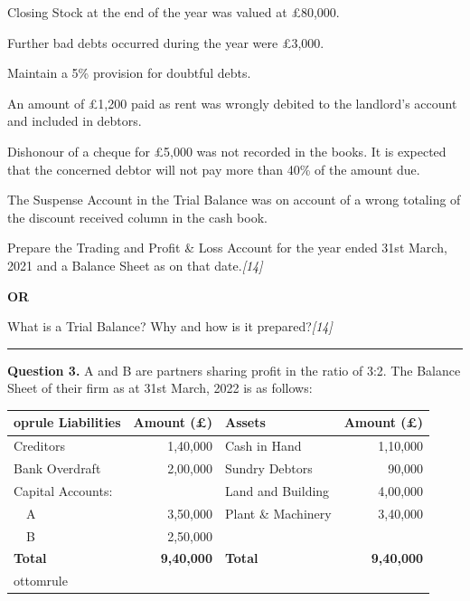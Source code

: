 \documentclass[11pt,a4paper]{article}
\newcommand{\pts}[1]{\hfill   \textit{[#1]}}
\begin{document}
\begin{parts}
  \item Closing Stock at the end of the year was valued at \pounds 80,000.
  \item Further bad debts occurred during the year were \pounds 3,000.
  \item Maintain a 5\% provision for doubtful debts.
  \item An amount of \pounds 1,200 paid as rent was wrongly debited to the landlord's account and included in debtors.
  \item Dishonour of a cheque for \pounds 5,000 was not recorded in the books. It is expected that the concerned debtor will not pay more than 40\% of the amount due.
  \item The Suspense Account in the Trial Balance was on account of a wrong totaling of the discount received column in the cash book.
\end{parts}
Prepare the Trading and Profit \& Loss Account for the year ended 31st March, 2021 and a Balance Sheet as on that date.\pts{14}

\centerline{   \textbf{OR}}

What is a Trial Balance? Why and how is it prepared?\pts{14}

\medskip\rule{\linewidth}{0.2pt}


\newpage




\noindent   \textbf{Question 3.}
A and B are partners sharing profit in the ratio of 3:2. The Balance Sheet of their firm as at 31st March, 2022 is as follows:


\begin{center}

\begin{tabular}{lr|lr}
 oprule
   \textbf{Liabilities} &   \textbf{Amount (\pounds)} &   \textbf{Assets} &   \textbf{Amount (\pounds)} \\
\midrule
Creditors & 1,40,000 & Cash in Hand & 1,10,000 \\
Bank Overdraft & 2,00,000 & Sundry Debtors & 90,000 \\
Capital Accounts: & & Land and Building & 4,00,000 \\
~~A & 3,50,000 & Plant \& Machinery & 3,40,000 \\
~~B & 2,50,000 & & \\
\midrule
   \textbf{Total} &   \textbf{9,40,000} &   \textbf{Total} &   \textbf{9,40,000} \\
ottomrule
\end{tabular}
\end{center}
\end{document}
